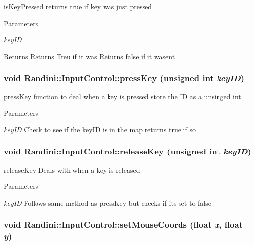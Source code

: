 isKeyPressed returns true if key was just pressed 
\begin{DoxyParams}{Parameters}
\item[{\em keyID}]\end{DoxyParams}
\begin{DoxyReturn}{Returns}
Returns Treu if it was Returns false if it wasent 
\end{DoxyReturn}
\hypertarget{classRandini_1_1InputControl_a1b1b8d717a70da6874a047d6a83f90df}{
\subsubsection[{pressKey}]{\setlength{\rightskip}{0pt plus 5cm}void Randini::InputControl::pressKey (unsigned int {\em keyID})}}
\label{classRandini_1_1InputControl_a1b1b8d717a70da6874a047d6a83f90df}


pressKey function to deal when a key is pressed store the ID as a unsinged int 
\begin{DoxyParams}{Parameters}
\item[{\em keyID}]Check to see if the keyID is in the map returns true if so \end{DoxyParams}
\hypertarget{classRandini_1_1InputControl_a64352005e174fb38a18cdee3874a3f2b}{
\subsubsection[{releaseKey}]{\setlength{\rightskip}{0pt plus 5cm}void Randini::InputControl::releaseKey (unsigned int {\em keyID})}}
\label{classRandini_1_1InputControl_a64352005e174fb38a18cdee3874a3f2b}


releaseKey Deals with when a key is released 
\begin{DoxyParams}{Parameters}
\item[{\em keyID}]Follows same method as pressKey but checks if its set to false \end{DoxyParams}
\hypertarget{classRandini_1_1InputControl_a7d59848ed252cba960ed66528460e4e3}{
\subsubsection[{setMouseCoords}]{\setlength{\rightskip}{0pt plus 5cm}void Randini::InputControl::setMouseCoords (float {\em x}, \/  float {\em y})}}
\label{classRandini_1_1InputControl_a7d59848ed252cba960ed66528460e4e3}


